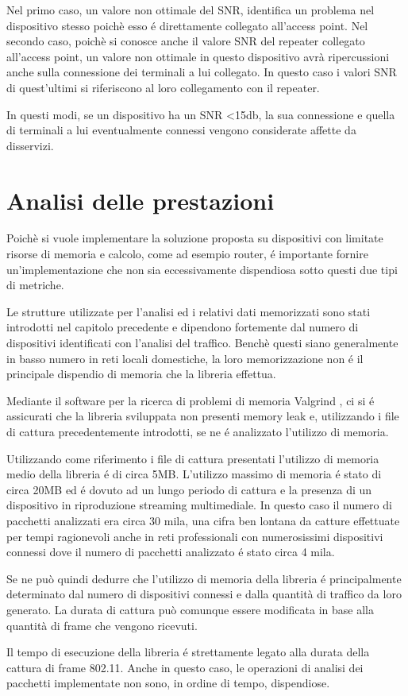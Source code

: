 Nel primo caso, un valore non ottimale del SNR, identifica un problema nel dispositivo stesso poich\`e esso \'e direttamente collegato all'access point.
Nel secondo caso, poich\`e si conosce anche il valore SNR del repeater collegato all'access point, un valore non ottimale in questo dispositivo avr\`a ripercussioni anche sulla connessione dei terminali a lui collegato.
In questo caso i valori SNR di quest'ultimi si riferiscono al loro collegamento con il repeater.

In questi modi, se un dispositivo ha un SNR <15db, la sua connessione e quella di  terminali a lui eventualmente connessi vengono considerate affette da disservizi.


\section{Analisi delle prestazioni}

Poich\`e si vuole implementare la soluzione proposta su dispositivi con limitate risorse di memoria e calcolo, come ad esempio router, \'e importante fornire un'implementazione che non sia eccessivamente dispendiosa sotto questi due tipi di metriche.

Le strutture utilizzate per l'analisi ed i relativi dati memorizzati sono stati introdotti nel capitolo precedente e dipendono fortemente dal numero di dispositivi identificati con l'analisi del traffico.
Bench\`e questi siano generalmente in basso numero in reti locali domestiche, la loro memorizzazione non \'e il principale dispendio di memoria che la libreria effettua.

Mediante il software per la ricerca di problemi di memoria Valgrind \cite{valgrind}, ci si \'e assicurati che la libreria sviluppata non presenti memory leak e, utilizzando i file di cattura precedentemente introdotti, se ne \'e analizzato l'utilizzo di memoria.

Utilizzando come riferimento i file di cattura presentati l'utilizzo di memoria medio della libreria \'e di circa 5MB.
L'utilizzo massimo di memoria \'e stato di circa 20MB ed \'e dovuto ad un lungo periodo di cattura e la presenza di un dispositivo in riproduzione streaming multimediale.
In questo caso il numero di pacchetti analizzati era circa 30 mila, una cifra ben lontana da catture effettuate per tempi ragionevoli anche in reti professionali con numerosissimi dispositivi connessi dove il numero di pacchetti analizzato \'e stato circa 4 mila.

Se ne pu\`o quindi dedurre che l'utilizzo di memoria della libreria \'e principalmente determinato dal numero di dispositivi connessi e dalla quantit\`a di traffico da loro generato.
La durata di cattura pu\`o comunque essere modificata in base alla quantit\`a di frame che vengono ricevuti.

Il tempo di esecuzione della libreria \'e strettamente legato alla durata della cattura di frame 802.11.
Anche in questo caso, le operazioni di analisi dei pacchetti implementate non sono, in ordine di tempo, dispendiose.
